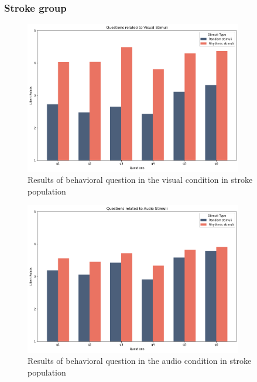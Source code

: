 \subsubsection*{Stroke group}
\begin{figure}[H]
    \centering
    \includegraphics[width=0.85\textwidth]{bar_plots/bar_visual_s.png}
    \caption{Results of behavioral question in the visual condition in stroke population}
    \label{fig: bar_visual_stroke} 
\end{figure} 
\begin{figure}[H]
    \centering
    \includegraphics[width=0.85\textwidth]{bar_plots/bar_audio_s.png}
    \caption{Results of behavioral question in the audio condition in stroke population}
    \label{fig: bar_audio_stroke} 
\end{figure} 
